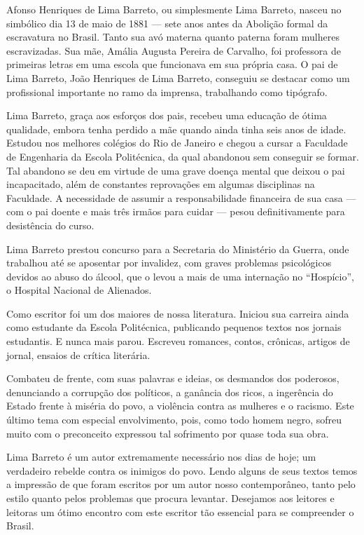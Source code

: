 
Afonso Henriques de Lima Barreto, ou simplesmente Lima Barreto, nasceu
no simbólico dia 13 de maio de 1881 --- sete anos antes da Abolição
formal da escravatura no Brasil. Tanto sua avó materna quanto paterna
foram mulheres escravizadas. Sua mãe, Amália Augusta Pereira de
Carvalho, foi professora de primeiras letras em uma escola que
funcionava em sua própria casa. O pai de Lima Barreto, João Henriques de
Lima Barreto, conseguiu se destacar como um profissional importante no
ramo da imprensa, trabalhando como tipógrafo.

Lima Barreto, graça aos esforços dos pais, recebeu uma educação de ótima
qualidade, embora tenha perdido a mãe quando ainda tinha seis anos de
idade. Estudou nos melhores colégios do Rio de Janeiro e chegou a cursar
a Faculdade de Engenharia da Escola Politécnica, da qual abandonou sem
conseguir se formar. Tal abandono se deu em virtude de uma grave doença
mental que deixou o pai incapacitado, além de constantes reprovações em
algumas disciplinas na Faculdade. A necessidade de assumir a
responsabilidade financeira de sua casa --- com o pai doente e mais três
irmãos para cuidar --- pesou definitivamente para desistência do curso.

Lima Barreto prestou concurso para a Secretaria do Ministério da Guerra,
onde trabalhou até se aposentar por invalidez, com graves problemas
psicológicos devidos ao abuso do álcool, que o levou a mais de uma
internação no ``Hospício'', o Hospital Nacional de Alienados.

Como escritor foi um dos maiores de nossa literatura. Iniciou sua
carreira ainda como estudante da Escola Politécnica, publicando pequenos
textos nos jornais estudantis. E nunca mais parou. Escreveu romances,
contos, crônicas, artigos de jornal, ensaios de crítica literária.

Combateu de frente, com suas palavras e ideias, os desmandos dos
poderosos, denunciando a corrupção dos políticos, a ganância dos ricos,
a ingerência do Estado frente à miséria do povo, a violência contra as
mulheres e o racismo. Este último tema com especial envolvimento, pois,
como todo homem negro, sofreu muito com o preconceito expressou tal
sofrimento por quase toda sua obra.

Lima Barreto é um autor extremamente necessário nos dias de hoje; um
verdadeiro rebelde contra os inimigos do povo. Lendo alguns de seus
textos temos a impressão de que foram escritos por um autor nosso
contemporâneo, tanto pelo estilo quanto pelos problemas que procura
levantar. Desejamos aos leitores e leitoras um ótimo encontro com este
escritor tão essencial para se compreender o Brasil.

